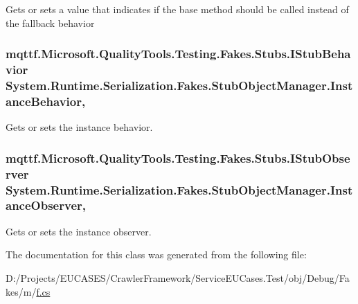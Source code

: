 Gets or sets a value that indicates if the base method should be called instead of the fallback behavior

\hypertarget{class_system_1_1_runtime_1_1_serialization_1_1_fakes_1_1_stub_object_manager_abe4cbfe267d25c77edaf4e2f17670e7a}{
\subsubsection[{Instance\-Behavior}]{\setlength{\rightskip}{0pt plus 5cm}mqttf.\-Microsoft.\-Quality\-Tools.\-Testing.\-Fakes.\-Stubs.\-I\-Stub\-Behavior System.\-Runtime.\-Serialization.\-Fakes.\-Stub\-Object\-Manager.\-Instance\-Behavior\hspace{0.3cm}{\ttfamily [get]}, {\ttfamily [set]}}}\label{class_system_1_1_runtime_1_1_serialization_1_1_fakes_1_1_stub_object_manager_abe4cbfe267d25c77edaf4e2f17670e7a}


Gets or sets the instance behavior.

\hypertarget{class_system_1_1_runtime_1_1_serialization_1_1_fakes_1_1_stub_object_manager_ac6b024fe2c8621bac628d3530cd5368d}{
\subsubsection[{Instance\-Observer}]{\setlength{\rightskip}{0pt plus 5cm}mqttf.\-Microsoft.\-Quality\-Tools.\-Testing.\-Fakes.\-Stubs.\-I\-Stub\-Observer System.\-Runtime.\-Serialization.\-Fakes.\-Stub\-Object\-Manager.\-Instance\-Observer\hspace{0.3cm}{\ttfamily [get]}, {\ttfamily [set]}}}\label{class_system_1_1_runtime_1_1_serialization_1_1_fakes_1_1_stub_object_manager_ac6b024fe2c8621bac628d3530cd5368d}


Gets or sets the instance observer.



The documentation for this class was generated from the following file\-:\begin{DoxyCompactItemize}
\item 
D\-:/\-Projects/\-E\-U\-C\-A\-S\-E\-S/\-Crawler\-Framework/\-Service\-E\-U\-Cases.\-Test/obj/\-Debug/\-Fakes/m/\hyperlink{m_2f_8cs}{f.\-cs}\end{DoxyCompactItemize}
